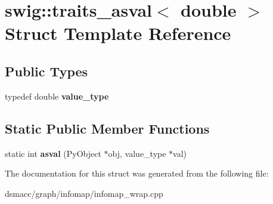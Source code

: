 \hypertarget{structswig_1_1traits__asval_3_01double_01_4}{}\section{swig\+:\+:traits\+\_\+asval$<$ double $>$ Struct Template Reference}
\label{structswig_1_1traits__asval_3_01double_01_4}
\subsection*{Public Types}
\begin{DoxyCompactItemize}
\item 
\mbox{\label{structswig_1_1traits__asval_3_01double_01_4_acc549718ce52880c4368a2e37f3ff544}} 
typedef double {\bfseries value\+\_\+type}
\end{DoxyCompactItemize}
\subsection*{Static Public Member Functions}
\begin{DoxyCompactItemize}
\item 
\mbox{\label{structswig_1_1traits__asval_3_01double_01_4_aa2b3a8491625ce70a1bb03c1cc851d9a}} 
static int {\bfseries asval} (Py\+Object $\ast$obj, value\+\_\+type $\ast$val)
\end{DoxyCompactItemize}


The documentation for this struct was generated from the following file\+:\begin{DoxyCompactItemize}
\item 
dsmacc/graph/infomap/infomap\+\_\+wrap.\+cpp\end{DoxyCompactItemize}
